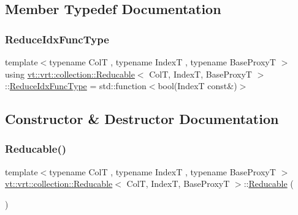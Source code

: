 \subsection{Member Typedef Documentation}
\mbox{\label{structvt_1_1vrt_1_1collection_1_1_reducable_a9f5a6c385efafe1fa52937f4809a9486}} 
\subsubsection{\texorpdfstring{Reduce\+Idx\+Func\+Type}{ReduceIdxFuncType}}
{\footnotesize\ttfamily template$<$typename ColT , typename IndexT , typename Base\+ProxyT $>$ \\
using \hyperlink{structvt_1_1vrt_1_1collection_1_1_reducable}{vt\+::vrt\+::collection\+::\+Reducable}$<$ ColT, IndexT, Base\+ProxyT $>$\+::\hyperlink{structvt_1_1vrt_1_1collection_1_1_reducable_a9f5a6c385efafe1fa52937f4809a9486}{Reduce\+Idx\+Func\+Type} =  std\+::function$<$bool(IndexT const\&)$>$}



\subsection{Constructor \& Destructor Documentation}
\mbox{\label{structvt_1_1vrt_1_1collection_1_1_reducable_a807b462380873448bfcf4661b4b28a2d}} 
\subsubsection{\texorpdfstring{Reducable()}{Reducable()}\hspace{0.1cm}{\footnotesize\ttfamily [1/4]}}
{\footnotesize\ttfamily template$<$typename ColT , typename IndexT , typename Base\+ProxyT $>$ \\
\hyperlink{structvt_1_1vrt_1_1collection_1_1_reducable}{vt\+::vrt\+::collection\+::\+Reducable}$<$ ColT, IndexT, Base\+ProxyT $>$\+::\hyperlink{structvt_1_1vrt_1_1collection_1_1_reducable}{Reducable} (\begin{DoxyParamCaption}{ }\end{DoxyParamCaption})\hspace{0.3cm}{\ttfamily [default]}}

